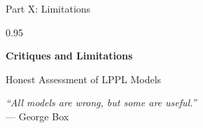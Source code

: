 \documentclass[9pt, aspectratio=169, t]{beamer}
\begin{document}
\begin{frame}{Part X: Limitations}
    \begin{cminipage}{0.95\textwidth}
    \begin{center}
        {\LARGE\color{MainBlue}\textbf{Critiques and Limitations}}

        \vspace{8mm}
        {\large Honest Assessment of LPPL Models}

        \vspace{8mm}
        \textit{``All models are wrong, but some are useful.''}\\
        --- George Box
    \end{center}
    \end{cminipage}
\end{frame}
\end{document}
